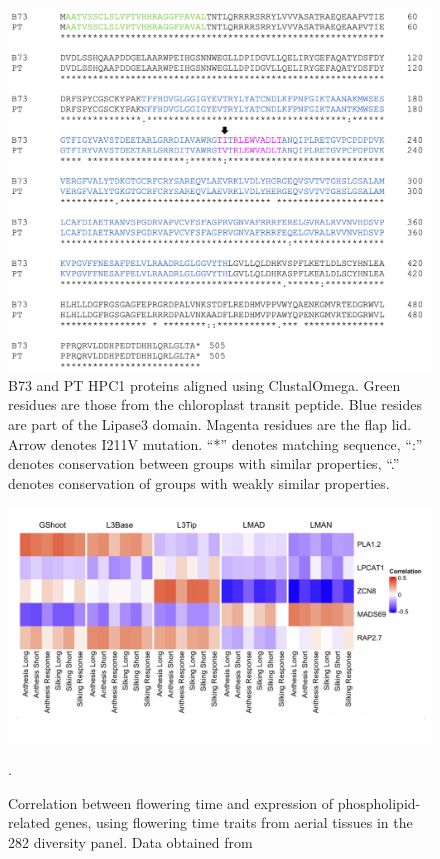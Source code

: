 \documentclass[9pt,twocolumn,twoside,lineno]{biorxiv}
\begin{document}
\clearpage

\begin{figure}[t]
\begin{center}
\includegraphics[width=0.8\paperwidth]{Sup_Figures/Sup_Fig_7.png}
\caption{B73 and PT HPC1 proteins aligned using ClustalOmega. 
Green residues are those from the chloroplast transit peptide. Blue resides are part of the Lipase3 domain. 
Magenta residues are the flap lid. 
Arrow denotes I211V mutation. “*” denotes matching sequence, “:” denotes conservation between groups with similar properties, “.” denotes conservation of groups with weakly similar properties. 
}
\label{SupFig7}
\end{center}
\end{figure} 


\clearpage

\begin{figure}[t]
\begin{center}
\includegraphics[width=0.8 \paperwidth]{Sup_Figures/Sup_Fig_8.png}
\caption{Correlation between flowering time and expression of phospholipid-related genes, using flowering time traits from aerial tissues in the 282 diversity panel. 
Data obtained from \cite{Kremling2018-gn}}.
\label{SupFig8}
\end{center}
\end{figure} 

\clearpage
\end{document}

